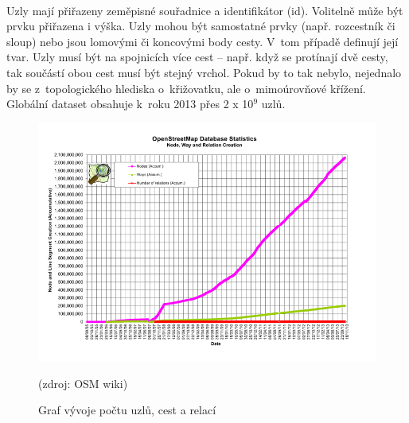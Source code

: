 \documentclass[11pt,a4paper,titlepage,oneside]{book}
\begin{document}


		\paragraph{}Uzly mají přiřazeny zeměpisné souřadnice a identifikátor (id). Volitelně může být prvku přiřazena i výška. Uzly mohou být samostatné prvky (např. rozcestník či sloup) nebo jsou lomovými či koncovými body cesty. V~tom případě definují její tvar. Uzly musí být na spojnicích více cest -- např. když se protínají dvě cesty, tak součástí obou cest musí být stejný vrchol. Pokud by to tak nebylo, nejednalo by se z~topologického hlediska o~křižovatku, ale o~mimoúrovňové křížení. Globální dataset obsahuje k~roku 2013 přes 2 x 10$^9$ uzlů\cite{osm_wiki_node}.



		\begin{figure}[!h]
			\begin{center}
				\includegraphics[width=12cm]{obrazky/osm_stat_elements.png}
				\caption{Graf vývoje počtu uzlů, cest a relací}(zdroj: \ac{OSM} wiki\cite{osm_wiki_stats})
				\label{fig:elements}
			\end{center}
		\end{figure}

\end{document}
